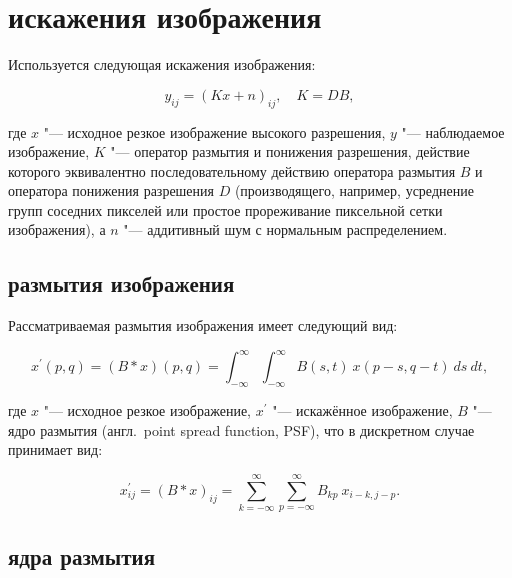 \section{ искажения изображения}

Используется следующая  искажения изображения:

\begin{equation*}
	y_{ij} = \left(Kx+n\right)_{ij},\quad K=DB,
\end{equation*}

\noindent где $x$ "--- исходное резкое изображение высокого разрешения, $y$ "--- наблюдаемое изображение, $K$ "--- оператор размытия и понижения разрешения, действие которого эквивалентно последовательному действию оператора размытия $B$ и оператора понижения разрешения $D$ (производящего, например, усреднение групп соседних пикселей или простое прореживание пиксельной сетки изображения), а $n$ "--- аддитивный шум с нормальным распределением.

\subsection{ размытия изображения} \label{sec:image-blur-model}

Рассматриваемая  размытия изображения имеет следующий вид:

\begin{equation*}
	x^\prime \left(p, q\right) = \left(B \ast x\right) \left(p, q\right) = \int_{-\infty}^{\infty}\int_{-\infty}^{\infty}{B\left(s,t\right)\ x\left(p-s,q-t\right)\ ds\ dt},
\end{equation*}

\noindent где $x$ "--- исходное резкое изображение, $x^\prime$ "--- искажённое изображение, $B$ "--- ядро размытия (англ.~point spread function, PSF), что в дискретном случае принимает вид:

\begin{equation*}
	x^\prime_{ij} = \left(B \ast x\right)_{ij} = \sum_{k=-\infty}^{\infty} \sum_{p=-\infty}^{\infty}{B_{kp}\ x_{i-k,j-p}}.
\end{equation*}

\subsection{ ядра размытия} \label{sec:microscope-psf}

